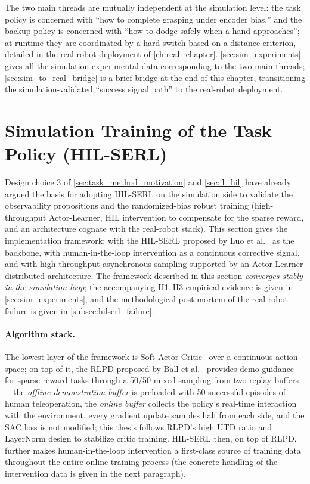 The two main threads are mutually independent at the simulation level: the task policy is concerned with ``how to complete grasping under encoder bias,'' and the backup policy is concerned with ``how to dodge safely when a hand approaches''; at runtime they are coordinated by a hard switch based on a distance criterion, detailed in the real-robot deployment of \cref{ch:real_chapter}. \cref{sec:sim_experiments} gives all the simulation experimental data corresponding to the two main threads; \cref{sec:sim_to_real_bridge} is a brief bridge at the end of this chapter, transitioning the simulation-validated ``success signal path'' to the real-robot deployment.

\section{Simulation Training of the Task Policy (HIL-SERL)}\label{sec:sim_task_train}

Design choice 3 of \cref{sec:task_method_motivation} and \cref{sec:il_hil} have already argued the basis for adopting HIL-SERL on the simulation side to validate the observability propositions and the randomized-bias robust training (high-throughput Actor-Learner, HIL intervention to compensate for the sparse reward, and an architecture cognate with the real-robot stack). This section gives the implementation framework: with the HIL-SERL proposed by Luo et al.~\cite{luo2025hilserl} as the backbone, with human-in-the-loop intervention as a continuous corrective signal, and with high-throughput asynchronous sampling supported by an Actor-Learner distributed architecture. The framework described in this section \emph{converges stably in the simulation loop}; the accompanying H1--H3 empirical evidence is given in \cref{sec:sim_experiments}, and the methodological post-mortem of the real-robot failure is given in \cref{subsec:hilserl_failure}.

\paragraph{Algorithm stack.} The lowest layer of the framework is Soft Actor-Critic~\cite{haarnoja2018sac} over a continuous action space; on top of it, the RLPD proposed by Ball et al.~\cite{ball2023rlpd} provides demo guidance for sparse-reward tasks through a 50/50 mixed sampling from two replay buffers---the \emph{offline demonstration buffer} is preloaded with 50 successful episodes of human teleoperation, the \emph{online buffer} collects the policy's real-time interaction with the environment, every gradient update samples half from each side, and the SAC loss is not modified; this thesis follows RLPD's high UTD ratio and LayerNorm design to stabilize critic training. HIL-SERL then, on top of RLPD, further makes human-in-the-loop intervention a first-class source of training data throughout the entire online training process (the concrete handling of the intervention data is given in the next paragraph).

